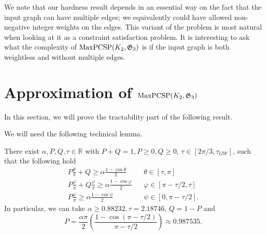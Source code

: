 \documentclass[a4paper,11pt, DIV=11]{scrartcl}
\renewcommand{\phi}{\varphi}
\renewcommand{\G}{\ensuremath{\mathfrak{G}}}
\DeclareMathOperator{\maxPCSP}{\textup{MaxPCSP}}
\renewcommand{\R}{\ensuremath{\mathbb{R}}}
\theoremstyle{plain}
\theoremstyle{definition}
\begin{document}
We note that our hardness result depends in an essential way on the fact that the input graph can have multiple edges; we equivalently could have allowed non-negative integer weights on the edges. This variant of the problem is most natural when looking at it as a constraint satisfaction problem. It is  interesting to ask what the complexity of $\maxPCSP(K_2, \G_3)$ is if the input graph is  both weightless and without multiple edges.


\section{\texorpdfstring{Approximation of $\maxPCSP(K_2, {\mathfrak{G}}_3)$}{Approximation of maxPCSP(K2,G3)}}
\label{sec:tractability}

In this section, we will prove the tractability part of the following result.

\main*

We will need the following technical lemma.

\begin{lemma}\label{lem:bounds}
    There exist $\alpha, P, Q, \tau \in \R$ with $P + Q = 1, P \geq 0, Q \geq 0$, $\tau \in [2 \pi / 3, \tau_{GW}]$, such that the following hold
\begin{align}
    P \frac{\theta}{\pi} + Q \geq \alpha \frac{1 - \cos\theta}{2} && \theta \in [\tau, \pi]\label{eq:cons1}\\
    P \frac{\phi}{\pi} + Q \frac{\phi}{\pi} \geq \alpha \frac{1 - \cos\phi}{2} && \phi \in [\pi - \tau/2, \tau]\label{eq:cons2}\\
    P \frac{\psi}{\pi} \geq \alpha \frac{1 - \cos \psi}{2} && \psi \in [0, \pi- \tau/2].\label{eq:cons3}
\end{align}
In particular, we can take $\alpha \geq 0.88232, \tau = 2.18746$, $Q = 1 - P$ and
\[
P = \frac{\alpha \pi}{2} \left(\frac{1 - \cos(\pi - \tau / 2)}{\pi - \tau / 2} \right) \approx 0.987535.
\]
\end{lemma}
\end{document}
